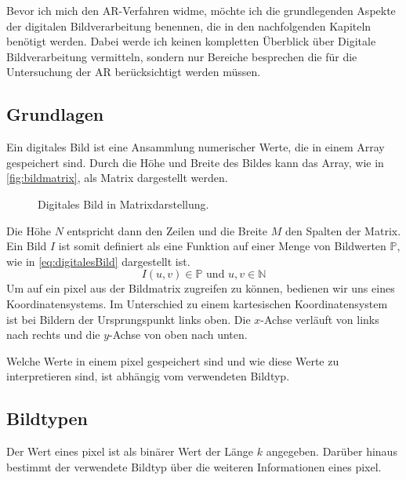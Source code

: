Bevor ich mich den \gls{AR}-Verfahren widme, möchte ich die grundlegenden Aspekte der digitalen Bildverarbeitung
 benennen, die in den nachfolgenden Kapiteln benötigt werden. Dabei werde ich keinen kompletten Überblick über Digitale
 Bildverarbeitung vermitteln, sondern nur Bereiche besprechen die für die Untersuchung der \gls{AR} berücksichtigt
 werden müssen.

\subsection{Grundlagen} %
\label{sub:grundlagen}

Ein digitales Bild ist eine Ansammlung numerischer Werte, die in einem Array gespeichert sind. Durch die Höhe und Breite des Bildes kann das Array, wie in \autoref{fig:bildmatrix}, als Matrix dargestellt werden.
\begin{figure}[!ht]
	\centering
	
	\caption{Digitales Bild in Matrixdarstellung.}
	\label{fig:bildmatrix}
\end{figure}
Die Höhe $N$ entspricht dann den Zeilen und die Breite $M$ den Spalten der Matrix. Ein Bild $I$ ist somit definiert als
 eine Funktion auf einer Menge von Bildwerten $\mathbb{P}$, wie in \autoref{eq:digitalesBild} dargestellt ist.
\begin{equation}
	I\left(u,v\right)\in\mathbb{P} \text{ und } u,v\in\mathbb{N}
	\label{eq:digitalesBild}
\end{equation}
Um auf ein \gls{pixel} aus der Bildmatrix zugreifen zu können, bedienen wir uns eines Koordinatensystems. Im
 Unterschied zu einem kartesischen Koordinatensystem ist bei Bildern der Ursprungspunkt links oben. Die \(x\)-Achse
 verläuft von links nach rechts und die \(y\)-Achse von oben nach unten. \begin{comment}\\TODO:vgl abbildung\end{comment}
Welche Werte in einem \gls{pixel} gespeichert sind und wie diese Werte zu interpretieren sind, ist abhängig vom
 verwendeten Bildtyp.


\subsection{Bildtypen} %
\label{sub:bildtypen}

Der Wert eines \gls{pixel} ist als binärer Wert der Länge $k$ angegeben. Darüber hinaus bestimmt der verwendete Bildtyp
 über die weiteren Informationen eines \gls{pixel}.

